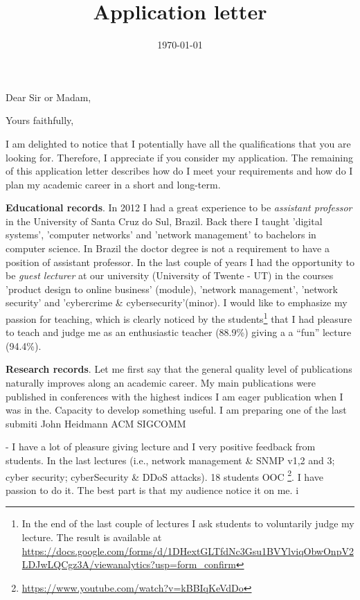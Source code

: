 \documentclass[10pt,a4paper,sans]{libs/moderncv}%
\title{Application letter}
\begin{document}
\date{\today} %
\opening{Dear Sir or Madam,}
\closing{Yours faithfully,}

\makelettertitle

\justify

I am delighted to notice that I potentially have all the qualifications that you
are looking for. Therefore, I appreciate if you consider my application. The
remaining of this application letter describes how do I meet your requirements
and how do I plan my academic career in a short and long-term.

\textbf{Educational records}. In 2012 I had a great experience to be
\textit{assistant professor} in the University of Santa Cruz do Sul, Brazil.
Back there I taught 'digital systems', 'computer networks' and 'network
management' to bachelors in computer science. In Brazil the doctor degree is not
a requirement to have a position of assistant professor. In the last couple of
years I had the opportunity to be \textit{guest lecturer} at our university
(University of Twente - UT) in the courses 'product design to online business'
(module), 'network management', 'network security' and 'cybercrime \&
cybersecurity'(minor). I would like to emphasize my passion for teaching, which
is clearly noticed by the students\footnote{In the end of the last couple of
lectures I ask students to voluntarily judge my lecture. The result is available
at
\url{https://docs.google.com/forms/d/1DHextGLTfdNc3Gsu1BVYlviqObwOnpV2LDJwLQCgz3A/viewanalytics?usp=form_confirm}}
that I had pleasure to teach and judge me as an enthusiastic teacher (88.9\%)
giving a a ``fun'' lecture (94.4\%). 

\textbf{Research records}. Let me first say that the general quality level of
publications naturally improves along an academic career. My main publications
were published in conferences with the highest indices I am eager publication
when I was in the.  Capacity to develop something useful.  I am preparing one of
the last submiti John Heidmann ACM SIGCOMM

- I have a lot of pleasure giving lecture and I very positive feedback from
students. In the last lectures (i.e., network management \& SNMP v1,2 and 3;
cyber security; cyberSecurity \& DDoS attacks). 18 students
OOC \footnote{\url{https://www.youtube.com/watch?v=kBBIqKeVdDo}}.  I have passion to do it. The best part is that my audience notice it on
me.  i
\end{document}

